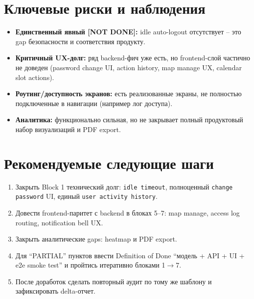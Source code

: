 \documentclass[12pt,a4paper]{article}
\begin{document}
\section{Ключевые риски и наблюдения}
\begin{riskbox}
\begin{itemize}
  \item \textbf{Единственный явный [NOT DONE]:} idle auto-logout отсутствует -- это gap безопасности и соответствия продукту.
  \item \textbf{Критичный UX-долг:} ряд backend-фич уже есть, но frontend-слой частично не доведен (password change UI, action history, map manage UX, calendar slot actions).
  \item \textbf{Роутинг/доступность экранов:} есть реализованные экраны, не полностью подключенные в навигации (например лог доступа).
  \item \textbf{Аналитика:} функционально сильная, но не закрывает полный продуктовый набор визуализаций и PDF export.
\end{itemize}
\end{riskbox}

\section{Рекомендуемые следующие шаги}
\begin{enumerate}
  \item Закрыть Block 1 технический долг: \texttt{idle timeout}, полноценный \texttt{change password} UI, единый \texttt{user activity history}.
  \item Довести frontend-паритет с backend в блоках 5--7: map manage, access log routing, notification bell UX.
  \item Закрыть аналитические gaps: heatmap и PDF export.
  \item Для ``PARTIAL'' пунктов ввести Definition of Done ``модель + API + UI + e2e smoke test'' и пройтись итеративно блоками 1$\rightarrow$7.
  \item После доработок сделать повторный аудит по тому же шаблону и зафиксировать delta-отчет.
\end{enumerate}
\end{document}
